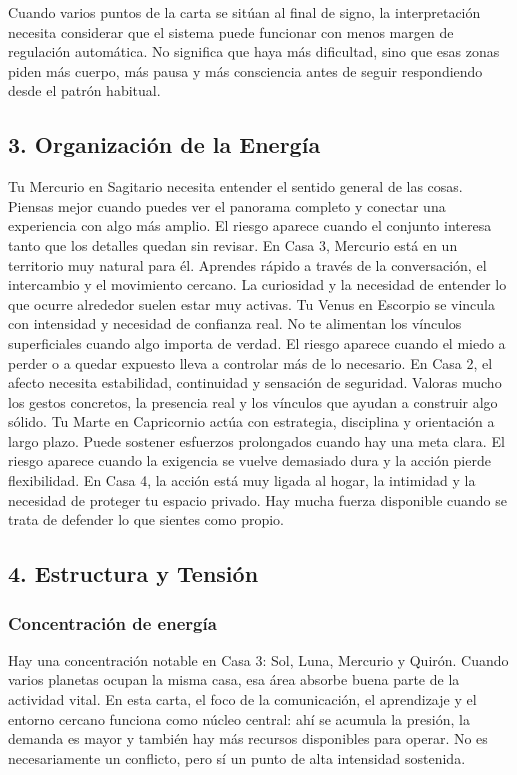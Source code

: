 \documentclass[11pt,a4paper]{article}\usepackage[utf8]{inputenc}
\begin{document}
Cuando varios puntos de la carta se sitúan al final de signo, la interpretación necesita considerar que el sistema puede funcionar con menos margen de regulación automática. No significa que haya más dificultad, sino que esas zonas piden más cuerpo, más pausa y más consciencia antes de seguir respondiendo desde el patrón habitual.



\subsection{3. Organización de la Energía}

Tu Mercurio en Sagitario necesita entender el sentido general de las cosas. Piensas mejor cuando puedes ver el panorama completo y conectar una experiencia con algo más amplio. El riesgo aparece cuando el conjunto interesa tanto que los detalles quedan sin revisar. En Casa 3, Mercurio está en un territorio muy natural para él. Aprendes rápido a través de la conversación, el intercambio y el movimiento cercano. La curiosidad y la necesidad de entender lo que ocurre alrededor suelen estar muy activas. Tu Venus en Escorpio se vincula con intensidad y necesidad de confianza real. No te alimentan los vínculos superficiales cuando algo importa de verdad. El riesgo aparece cuando el miedo a perder o a quedar expuesto lleva a controlar más de lo necesario. En Casa 2, el afecto necesita estabilidad, continuidad y sensación de seguridad. Valoras mucho los gestos concretos, la presencia real y los vínculos que ayudan a construir algo sólido. Tu Marte en Capricornio actúa con estrategia, disciplina y orientación a largo plazo. Puede sostener esfuerzos prolongados cuando hay una meta clara. El riesgo aparece cuando la exigencia se vuelve demasiado dura y la acción pierde flexibilidad. En Casa 4, la acción está muy ligada al hogar, la intimidad y la necesidad de proteger tu espacio privado. Hay mucha fuerza disponible cuando se trata de defender lo que sientes como propio.

\subsection{4. Estructura y Tensión}

\subsubsection*{Concentración de energía}

Hay una concentración notable en Casa 3: Sol, Luna, Mercurio y Quirón. Cuando varios planetas ocupan la misma casa, esa área absorbe buena parte de la actividad vital. En esta carta, el foco de la comunicación, el aprendizaje y el entorno cercano funciona como núcleo central: ahí se acumula la presión, la demanda es mayor y también hay más recursos disponibles para operar. No es necesariamente un conflicto, pero sí un punto de alta intensidad sostenida.
\end{document}
